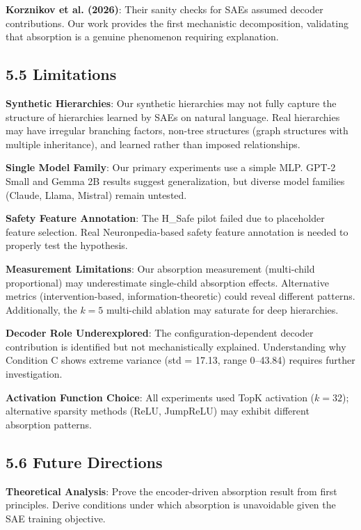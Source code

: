 \documentclass{article}
\begin{document}
\textbf{Korznikov et al. (2026)}: Their sanity checks for SAEs assumed decoder contributions. Our work provides the first mechanistic decomposition, validating that absorption is a genuine phenomenon requiring explanation.

\subsection{5.5 Limitations}

\textbf{Synthetic Hierarchies}: Our synthetic hierarchies may not fully capture the structure of hierarchies learned by SAEs on natural language. Real hierarchies may have irregular branching factors, non-tree structures (graph structures with multiple inheritance), and learned rather than imposed relationships.

\textbf{Single Model Family}: Our primary experiments use a simple MLP. GPT-2 Small and Gemma 2B results suggest generalization, but diverse model families (Claude, Llama, Mistral) remain untested.

\textbf{Safety Feature Annotation}: The H\_Safe pilot failed due to placeholder feature selection. Real Neuronpedia-based safety feature annotation is needed to properly test the hypothesis.

\textbf{Measurement Limitations}: Our absorption measurement (multi-child proportional) may underestimate single-child absorption effects. Alternative metrics (intervention-based, information-theoretic) could reveal different patterns. Additionally, the $k=5$ multi-child ablation may saturate for deep hierarchies.

\textbf{Decoder Role Underexplored}: The configuration-dependent decoder contribution is identified but not mechanistically explained. Understanding why Condition C shows extreme variance (std = 17.13, range 0--43.84) requires further investigation.

\textbf{Activation Function Choice}: All experiments used TopK activation ($k=32$); alternative sparsity methods (ReLU, JumpReLU) may exhibit different absorption patterns.

\subsection{5.6 Future Directions}

\textbf{Theoretical Analysis}: Prove the encoder-driven absorption result from first principles. Derive conditions under which absorption is unavoidable given the SAE training objective.
\end{document}

